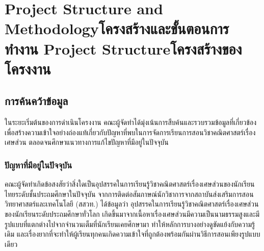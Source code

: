 \chapter{\ifproject%
\ifenglish Project Structure and Methodology\else โครงสร้างและขั้นตอนการทำงาน\fi
\else%
\ifenglish Project Structure\else โครงสร้างของโครงงาน\fi
\fi
}

\makeatletter


\makeatother

\section{การค้นคว้าข้อมูล}
ในระยะเริ่มต้นของการดำเนินโครงงาน คณะผู้จัดทำได้มุ่งเน้นการสืบค้นและรวบรวมข้อมูลที่เกี่ยวข้อง 
เพื่อสร้างความเข้าใจอย่างถ่องแท้เกี่ยวกับปัญหาที่พบในการจัดการเรียนการสอนวิชาคณิตศาสตร์เรื่องเศษส่วน ตลอดจนศึกษาแนวทางการแก้ไขปัญหาที่มีอยู่ในปัจจุบัน

\subsection{ปัญหาที่มีอยู่ในปัจจุบัน}
คณะผู้จัดทำเกิดข้อสงสัยว่าสิ่งใดเป็นอุปสรรคในการเรียนรู้วิชาคณิตศาสตร์เรื่องเศษส่วนของนักเรียนไทยระดับชั้นประถมศึกษาในปัจจุบัน 
จากการติดต่อสัมภาษณ์นักวิชาการจากสถาบันส่งเสริมการสอนวิทยาศาสตร์และเทคโนโลยี (สสวท.) ได้ข้อมูลว่า 
อุปสรรคในการเรียนรู้วิชาคณิตศาสตร์เรื่องเศษส่วนของนักเรียนระดับประถมศึกษาทั่วโลก เกิดขึ้นมาจากเนื้อหาเรื่องเศษส่วนมีความเป็นนามธรรมสูงและมีรูปแบบที่แตกต่างไปจากจำนวนเต็มที่นักเรียนเคยศึกษามา 
ทำให้หลักการบางอย่างดูขัดแย้งกับความรู้เดิม และเรื่องยากที่จะทำให้ผู้เรียนทุกคนเกิดความเข้าใจที่ถูกต้องพร้อมกันผ่านวิธีการสอนเพียงรูปแบบเดียว

